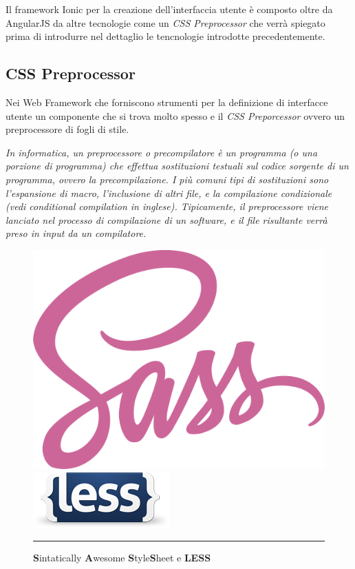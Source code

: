 Il framework Ionic per la creazione dell'interfaccia utente è composto oltre da AngularJS da altre tecnologie come un \emph{CSS Preprocessor} che verrà spiegato prima di introdurre nel dettaglio le tencnologie introdotte precedentemente.

\subsection{CSS Preprocessor}

Nei Web Framework che forniscono strumenti per la definizione di interfacce utente un componente che si trova molto spesso e il \emph{CSS Preporcessor} ovvero un preprocessore di fogli di stile.

\emph{In informatica, un preprocessore o precompilatore è un programma (o una porzione di programma) che effettua sostituzioni testuali sul codice sorgente di un programma, ovvero la precompilazione. I più comuni tipi di sostituzioni sono l'espansione di macro, l'inclusione di altri file, e la compilazione condizionale (vedi conditional compilation in inglese). Tipicamente, il preprocessore viene lanciato nel processo di compilazione di un software, e il file risultante verrà preso in input da un compilatore.}
\hspace*{\fill}\cite{wiki:preprocessor} 

\begin{figure}[htbp]
  \centering
    \includegraphics[scale=0.25]{Figures/sass-logo.png} 
    \includegraphics[scale=0.75]{Figures/less-logo.png} 
    \rule{35em}{0.5pt}
  \caption[Css Preprocessors]{\textbf{S}intatically \textbf{A}wesome \textbf{S}tyle\textbf{S}heet e \textbf{LESS}}
  \label{fig:CSS Preprocessors}
\end{figure}


